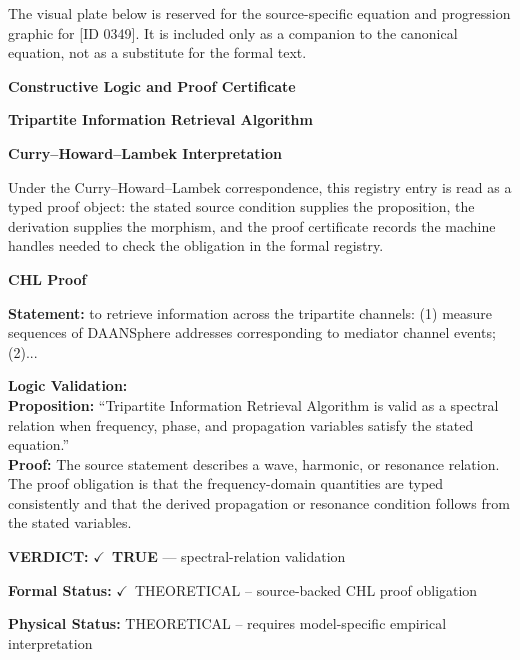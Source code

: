 \begingroup\footnotesize\sloppy
The visual plate below is reserved for the source-specific equation and progression graphic for [ID 0349]. It is included only as a companion to the canonical equation, not as a substitute for the formal text.
\par\endgroup
\ifTZPDarkEdition
{}
\fi

\clearpage
\begingroup\tzpsupportsetup
\noindent\textbf{\fontsize{10.8pt}{12.8pt}\selectfont [ID 0349] Constructive Logic and Proof Certificate}\par
\noindent\textbf{\fontsize{10pt}{12pt}\selectfont Tripartite Information Retrieval Algorithm}\par
\vspace{0.45em}
\begingroup
\footnotesize
\setlength{\parskip}{0.22em}
\setlength{\parindent}{0pt}
\noindent\textbf{Curry--Howard--Lambek Interpretation}\par
Under the Curry--Howard--Lambek correspondence, this registry entry is read as a typed proof
object: the stated source condition supplies the proposition, the derivation supplies the
morphism, and the proof certificate records the machine handles needed to check the obligation
in the formal registry.

\vspace{0.45em}
\noindent\textbf{CHL Proof}\par
\textbf{Statement:} to retrieve information across the tripartite channels: (1) measure sequences of
DAANSphere addresses corresponding to mediator channel events; (2)...

\textbf{Logic Validation:}\\
\textbf{Proposition:} ``Tripartite Information Retrieval Algorithm is valid as a spectral relation when
frequency, phase, and propagation variables satisfy the stated equation.''\\
\textbf{Proof:} The source statement describes a wave, harmonic, or resonance relation. The proof
obligation is that the frequency-domain quantities are typed consistently and that the
derived propagation or resonance condition follows from the stated variables.

\textbf{VERDICT:} \ensuremath{\checkmark}\ \textbf{TRUE} --- spectral-relation validation

\textbf{Formal Status:} \ensuremath{\checkmark}\ THEORETICAL -- source-backed CHL proof obligation

\textbf{Physical Status:} THEORETICAL -- requires model-specific empirical interpretation
\par\vspace{0.45em}
\par
\ifTZPDarkEdition
{}
\fi
\endgroup
\endgroup
